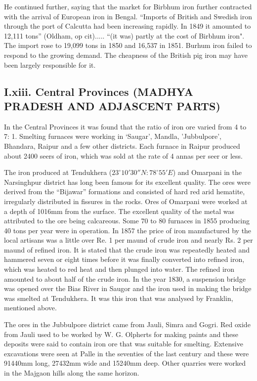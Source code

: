 He continued further, saying that the market for Birbhum iron further contracted with the arrival of European iron in Bengal.  “Imports of British and Swedish iron through the port of Calcutta had been increasing rapidly.  In 1849 it amounted to 12,111 tons” (Oldham, op cit)..... “(it was) partly at the cost of Birbhum iron".  The import rose to 19,099 tons in 1850 and 16,537 in 1851.  Burhum iron failed to respond to the growing demand.  The cheapness of the British pig iron may have been largely responsible for it.

\subsection*{I.xiii.  Central Provinces (MADHYA PRADESH AND ADJASCENT PARTS)}\label{subsection-13}

In the Central Provinces it was found that the ratio of iron ore varied from 4 to 7: 1. Smelting furnaces were working in ‘Saugar’, Mandla, 'Jubbulpore', Bhandara, Raipur and a few other districts. Each furnace in Raipur produced about 2400 seers of iron, which was sold at the rate of 4 annas per seer or less. 

The iron produced at Tendukhera ($23^\circ 10' 30''N: 78^\circ 55'E$) and Omarpani in the Narsinghpur district has long been famous for its excellent quality. The ores were derived from the “Bijawar” formations and consisted of hard red arid hematite, irregularly distributed in fissures in the rocks. Ores of Omarpani were worked at a depth of 1016mm from the surface. The excellent quality of the metal was attributed to the ore being calcareous. Some 70 to 80 furnaces in 1855 producing 40 tons per year were in operation. In 1857 the price of iron manufactured by the local artisans was a little over Re. 1 per maund of crude iron and nearly Rs. 2 per maund of refined iron. It is stated that the crude iron was repeatedly heated and hammered seven or eight times before it was finally converted into refined iron, which was heated to red heat and then plunged into water. The refined iron amounted to about half of the crude iron. In the year 1830, a suspension bridge was opened over the Bias River in Saugor and the iron used in making the bridge was smelted at Tendukhera. It was this iron that was analysed by Franklin, mentioned above.

The ores in the Jubbulpore district came from Jauli, Simra and Gogri. Red oxide from Jauli used to be worked by W. G. Olpherts for making paints and these deposits were said to contain iron ore that was suitable for smelting. Extensive excavations were seen at Palle in the seventies of the last century and these were 91440mm long, 27432mm wide and 15240mm deep. Other quarries were worked in the Majgaon hills along the same horizon. 

